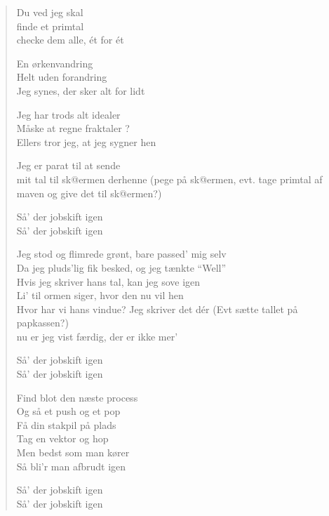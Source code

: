 \documentclass[a4paper,11pt]{article}
\begin{document}
\begin{sketch}
\begin{verse}
Du ved jeg skal\\
finde et primtal \\
checke dem alle, \'et for \'et

En ørkenvandring \\
Helt uden forandring \\
Jeg synes, der sker alt for lidt

Jeg har trods alt idealer \\
Måske at regne fraktaler ? \\
Ellers tror jeg, at jeg sygner hen

Jeg er parat til at sende \\
mit tal til sk@ermen derhenne (pege på sk@ermen, evt. tage primtal af
maven og give det til sk@ermen?)


Så' der jobskift igen \\
Så' der jobskift igen


Jeg stod og flimrede grønt, bare passed' mig selv \\
Da jeg pluds'lig fik besked, og jeg tænkte ``Well'' \\
Hvis jeg skriver hans tal, kan jeg sove igen \\
Li' til ormen siger, hvor den nu vil hen \\
Hvor har vi hans vindue? Jeg skriver det d\'er (Evt sætte tallet på
papkassen?) \\
nu er jeg vist færdig, der er ikke mer'


Så' der jobskift igen \\
Så' der jobskift igen

Find blot den næste process \\
Og så et push og et pop \\
Få din stakpil på plads \\
Tag en vektor og hop \\
Men bedst som man kører \\
Så bli'r man afbrudt igen

Så' der jobskift igen \\
Så' der jobskift igen 

\end{verse}

\end{sketch}
\end{document}
